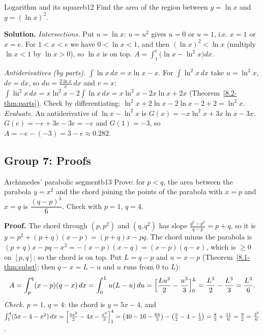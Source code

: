 \documentclass[11pt]{article}
\begin{document}
\begin{exmp}{Logarithm and its square}{b12}
Find the area of the region between $y=\ln x$ and $y=(\ln x)^2$.

\textbf{Solution.} \emph{Intersections.} Put $u=\ln x$: $u=u^2$ gives $u=0$ or $u=1$, i.e. $x=1$ or $x=e$. For $1<x<e$ we have $0<\ln x<1$, and then $(\ln x)^2<\ln x$ (multiply $\ln x<1$ by $\ln x>0$), so $\ln x$ is on top. $A=\int_1^e\bigl(\ln x-\ln^2x\bigr)dx$.

\emph{Antiderivatives (by parts).} $\int\ln x\,dx=x\ln x-x$. For $\int\ln^2x\,dx$ take $u=\ln^2x$, $dv=dx$, so $du=\frac{2\ln x}x\,dx$ and $v=x$: $\int\ln^2x\,dx=x\ln^2x-2\int\ln x\,dx=x\ln^2x-2x\ln x+2x$ (Theorem~\ref{8.2-thm:parts}). Check by differentiating: $\ln^2x+2\ln x-2\ln x-2+2=\ln^2x$.
\emph{Evaluate.} An antiderivative of $\ln x-\ln^2x$ is $G(x)=-x\ln^2x+3x\ln x-3x$. $G(e)=-e+3e-3e=-e$ and $G(1)=-3$, so $A=-e-(-3)=3-e\approx0.282$.
\end{exmp}

\subsection*{Group 7: Proofs}

\begin{exmp}{Archimedes' parabolic segment}{b13}
Prove: for $p<q$, the area between the parabola $y=x^2$ and the chord joining the points of the parabola with $x=p$ and $x=q$ is $\dfrac{(q-p)^3}6$. Check with $p=1$, $q=4$.

\textbf{Proof.} The chord through $(p,p^2)$ and $(q,q^2)$ has slope $\frac{q^2-p^2}{q-p}=p+q$, so it is $y=p^2+(p+q)(x-p)=(p+q)x-pq$. The chord minus the parabola is $(p+q)x-pq-x^2=-(x-p)(x-q)=(x-p)(q-x)$, which is $\ge0$ on $[p,q]$; so the chord is on top. Put $L=q-p$ and $u=x-p$ (Theorem~\ref{8.1-thm:subst}; then $q-x=L-u$ and $u$ runs from $0$ to $L$):
\[
A=\int_p^q(x-p)(q-x)\,dx=\int_0^Lu(L-u)\,du=\Bigl[\frac{Lu^2}2-\frac{u^3}3\Bigr]_0^L=\frac{L^3}2-\frac{L^3}3=\frac{L^3}6 .
\]
\emph{Check.} $p=1$, $q=4$: the chord is $y=5x-4$, and $\int_1^4(5x-4-x^2)\,dx=\Bigl[\frac{5x^2}2-4x-\frac{x^3}3\Bigr]_1^4=\left(40-16-\frac{64}3\right)-\left(\frac52-4-\frac13\right)=\frac83+\frac{11}6=\frac92=\frac{3^3}6$. \checkmark
\end{exmp}
\end{document}
